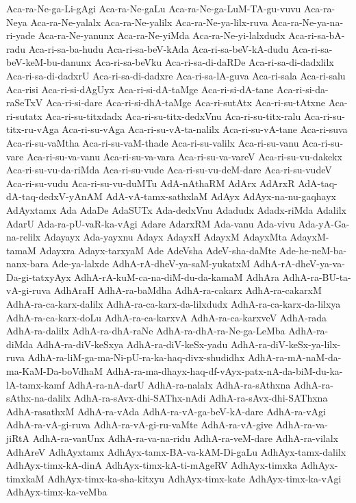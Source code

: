 {Aca-ra-Ne-ga-Li-gAgi
Aca-ra-Ne-gaLu
Aca-ra-Ne-ga-LuM-TA-gu-vuvu
Aca-ra-Neya
Aca-ra-Ne-yalalx
Aca-ra-Ne-yalilx
Aca-ra-Ne-ya-lilx-ruva
Aca-ra-Ne-ya-na-ri-yade
Aca-ra-Ne-yanunx
Aca-ra-Ne-yiMda
Aca-ra-Ne-yi-lalxdudx
Aca-ri-sa-bA-radu
Aca-ri-sa-ba-hudu
Aca-ri-sa-beV-kAda
Aca-ri-sa-beV-kA-dudu
Aca-ri-sa-beV-keM-bu-danunx
Aca-ri-sa-beVku
Aca-ri-sa-di-daRDe
Aca-ri-sa-di-dadxlilx
Aca-ri-sa-di-dadxrU
Aca-ri-sa-di-dadxre
Aca-ri-sa-lA-guva
Aca-ri-sala
Aca-ri-salu
Aca-risi
Aca-ri-si-dAgUyx
Aca-ri-si-dA-taMge
Aca-ri-si-dA-tane
Aca-ri-si-da-raSeTxV
Aca-ri-si-dare
Aca-ri-si-dhA-taMge
Aca-ri-sutAtx
Aca-ri-su-tAtxne
Aca-ri-sutatx
Aca-ri-su-titxdadx
Aca-ri-su-titx-dedxVnu
Aca-ri-su-titx-ralu
Aca-ri-su-titx-ru-vAga
Aca-ri-su-vAga
Aca-ri-su-vA-ta-nalilx
Aca-ri-su-vA-tane
Aca-ri-suva
Aca-ri-su-vaMtha
Aca-ri-su-vaM-thade
Aca-ri-su-valilx
Aca-ri-su-vanu
Aca-ri-su-vare
Aca-ri-su-va-vanu
Aca-ri-su-va-vara
Aca-ri-su-va-vareV
Aca-ri-su-vu-dakekx
Aca-ri-su-vu-da-riMda
Aca-ri-su-vude
Aca-ri-su-vu-deM-dare
Aca-ri-su-vudeV
Aca-ri-su-vudu
Aca-ri-su-vu-duMTu
AdA-nAthaRM
AdArx
AdArxR
AdA-taq-dA-taq-dedxV-yAnAM
AdA-vA-tamx-sathxlaM
AdAyx
AdAyx-na-nu-gaqhayx
AdAyxtamx
Ada
AdaDe
AdaSUTx
Ada-dedxVnu
Adadudx
Adadx-riMda
Adalilx
AdarU
Ada-ra-pU-vaR-ka-vAgi
Adare
AdarxRM
Ada-vanu
Ada-vivu
Ada-yA-Ga-na-relilx
Adayayx
Ada-yayxnu
Adayx
AdayxH
AdayxM
AdayxMta
AdayxM-tamaM
Adayxra
Adayx-tarxyaM
Ade
AdeVsha
AdeV-sha-daMte
Ade-he-neM-ba-nanx-bara
Ade-ya-lalxde
AdhA-rA-dheV-ya-saM-yukatxM
AdhA-rA-dheV-ya-va-Da-gi-tatxyAyx
AdhA-rA-kuM-ca-na-diM-du-da-kamaM
AdhAra
AdhA-ra-BU-ta-vA-gi-ruva
AdhAraH
AdhA-ra-baMdha
AdhA-ra-cakarx
AdhA-ra-cakarxM
AdhA-ra-ca-karx-dalilx
AdhA-ra-ca-karx-da-lilxdudx
AdhA-ra-ca-karx-da-lilxya
AdhA-ra-ca-karx-doLu
AdhA-ra-ca-karxvA
AdhA-ra-ca-karxveV
AdhA-rada
AdhA-ra-dalilx
AdhA-ra-dhA-raNe
AdhA-ra-dhA-ra-Ne-ga-LeMba
AdhA-ra-diMda
AdhA-ra-diV-keSxya
AdhA-ra-diV-keSx-yadu
AdhA-ra-diV-keSx-ya-lilx-ruva
AdhA-ra-liM-ga-ma-Ni-pU-ra-ka-haq-divx-shudidhx
AdhA-ra-mA-naM-da-ma-KaM-Da-boVdhaM
AdhA-ra-ma-dhayx-haq-df-vAyx-patx-nA-da-biM-du-ka-lA-tamx-kamf
AdhA-ra-nA-darU
AdhA-ra-nalalx
AdhA-ra-sAthxna
AdhA-ra-sAthx-na-dalilx
AdhA-ra-sAvx-dhi-SAThx-nAdi
AdhA-ra-sAvx-dhi-SAThxna
AdhA-rasathxM
AdhA-ra-vAda
AdhA-ra-vA-ga-beV-kA-dare
AdhA-ra-vAgi
AdhA-ra-vA-gi-ruva
AdhA-ra-vA-gi-ru-vaMte
AdhA-ra-vA-give
AdhA-ra-va-jiRtA
AdhA-ra-vanUnx
AdhA-ra-va-na-ridu
AdhA-ra-veM-dare
AdhA-ra-vilalx
AdhAreV
AdhAyxtamx
AdhAyx-tamx-BA-va-kAM-Di-gaLu
AdhAyx-tamx-dalilx
AdhAyx-timx-kA-dinA
AdhAyx-timx-kA-ti-mAgeRV
AdhAyx-timxka
AdhAyx-timxkaM
AdhAyx-timx-ka-sha-kitxyu
AdhAyx-timx-kate
AdhAyx-timx-ka-vAgi
AdhAyx-timx-ka-veMba
}
